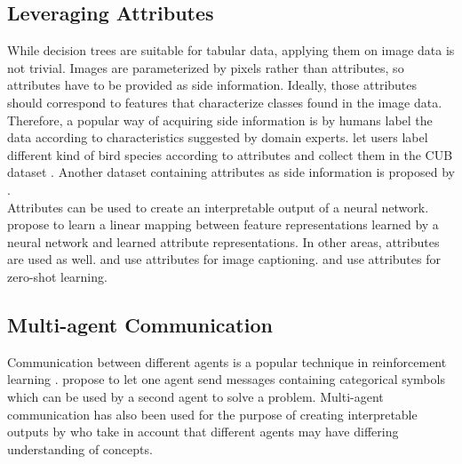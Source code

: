 \documentclass[a4paper,cleardoubleempty,BCOR1cm, 11pt]{report}
\begin{document}
\subsection{Leveraging Attributes}
While decision trees are suitable for tabular data, applying them on image data is not trivial. Images are parameterized by pixels rather than attributes, so attributes have to be provided as side information. Ideally, those attributes should correspond to features that characterize classes found in the image data. Therefore, a popular way of acquiring side information is by humans label the data according to characteristics suggested by domain experts. \citet{WelinderEtal2010} let users label different kind of bird species according to attributes and collect them in the CUB dataset \cite{WelinderEtal2010}. Another dataset containing attributes as side information is proposed by \citet{8413121}.\\
Attributes can be used to create an interpretable output of a neural network. \citet{akata2013label} propose to learn a linear mapping between feature representations learned by a neural network and learned attribute representations.
In other areas, attributes are used as well. \citet{kulkarni2013babytalk} and \citet{ordonez2011im2text} use attributes for image captioning. \citet{lampert2009learning} and \citet{palatucci2009zero} use attributes for zero-shot learning.


\subsection{Multi-agent Communication}
Communication between different agents is a popular technique in reinforcement learning \cite{havrylov2017emergence, lazaridou2018emergence, cao2018emergent, jiang2018learning, das2019tarmac}. \citet{foerster2016learning} propose to let one agent send messages containing categorical symbols which can be used by a second agent to solve a problem. Multi-agent communication has also been used for the purpose of creating interpretable outputs by \citet{rodriguez2019modeling} who take in account that different agents may have differing understanding of concepts. 
\end{document}
